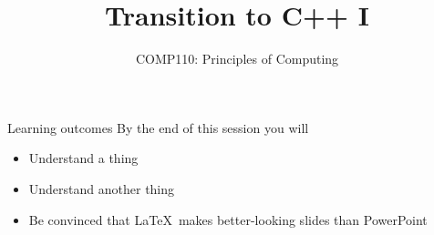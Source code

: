 \documentclass[xcolor={dvipsnames}]{beamer}\usepackage{etoolbox}\newtoggle{printable}\togglefalse{printable}
\begin{document}
\title{Transition to C++ I}   
\subtitle{COMP110: Principles of Computing}

\frame{\titlepage} 

\begin{frame}{Learning outcomes}
	By the end of this session you will
	\begin{itemize}
		\item Understand a thing
		\item Understand another thing
		\item Be convinced that \LaTeX\ makes better-looking slides than PowerPoint
	\end{itemize}
\end{frame}










%
\end{document}
